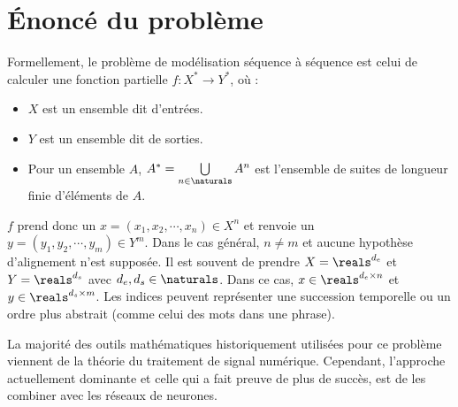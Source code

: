 \section{Énoncé du problème}

Formellement, le problème de modélisation séquence à séquence est celui de calculer une fonction partielle
\(f: X^\ast \to Y^\ast\), où :
\begin{itemize}
    \item  \(X\) est un ensemble dit d'entrées. 
    \item \(Y\) est un ensemble dit de sorties.
    \item Pour un ensemble \(A\), \(A^\ast = \bigcup\limits_{n\in\naturals}A^n\)
    est l'ensemble de suites de longueur finie d'éléments de \(A\).
\end{itemize}
\(f\) prend donc un \(x = (x_1, x_2,\cdots, x_n)\in X^n\) 
et renvoie un \(y = (y_1, y_2,\cdots, y_m)\in Y^m\).
Dans le cas général, \(n\neq m\) et aucune hypothèse d'alignement n'est supposée.
Il est souvent de prendre \(X = \reals^{d_e}\) et \(Y = \reals^{d_s}\) avec \(d_e, d_s\in\naturals\).
Dans ce cas, \(x\in \reals^{d_e\times n}\) et \(y\in \reals^{d_s\times m}\).
Les indices peuvent représenter une succession temporelle ou un ordre plus abstrait 
(comme celui des mots dans une phrase).

La majorité des outils mathématiques historiquement utilisées pour ce problème 
viennent de la théorie du traitement de signal numérique.
Cependant, l'approche actuellement dominante et celle qui a fait preuve de plus de succès,  
est de les combiner avec les réseaux de neurones.